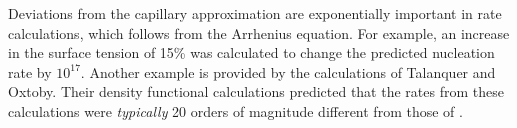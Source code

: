 Deviations from the capillary approximation are exponentially important in rate calculations,
which follows from the Arrhenius equation.
For example, an increase in the surface tension of 15\%
was calculated\cite{Kiang1971} to change the predicted nucleation rate by $10^{17}$.
Another example is provided by the calculations of Talanquer and Oxtoby\cite{Talanquer1995, Oxtoby1988}.
Their  density functional calculations 
predicted that the rates  from these  calculations were  {\em typically}   20 orders of magnitude different from those of \cnt.






